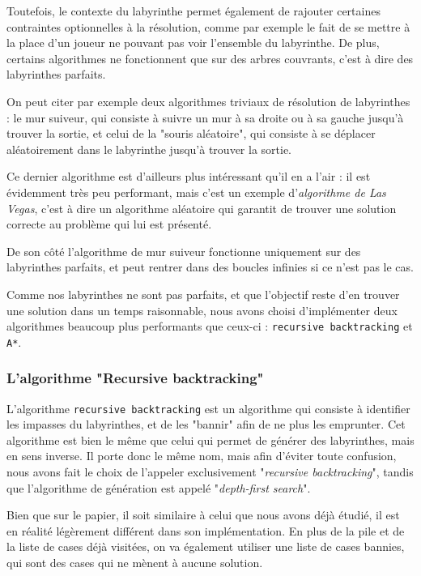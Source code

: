 \documentclass[12pt]{scrreprt} %
\begin{document}
Toutefois, le contexte du labyrinthe permet également de rajouter certaines contraintes optionnelles à la résolution, comme par exemple le fait de se mettre à la place d'un joueur ne pouvant pas voir l'ensemble du labyrinthe. De plus, certains algorithmes ne fonctionnent que sur des arbres couvrants, c'est à dire des labyrinthes parfaits.

On peut citer par exemple deux algorithmes triviaux de résolution de labyrinthes : le mur suiveur, qui consiste à suivre un mur à sa droite ou à sa gauche jusqu'à trouver la sortie, et celui de la "souris aléatoire", qui consiste à se déplacer aléatoirement dans le labyrinthe jusqu'à trouver la sortie.

Ce dernier algorithme est d'ailleurs plus intéressant qu'il en a l'air : il est évidemment très peu performant, mais c'est un exemple d'\textit{algorithme de Las Vegas}, c'est à dire un algorithme aléatoire qui garantit de trouver une solution correcte au problème qui lui est présenté.

De son côté l'algorithme de mur suiveur fonctionne uniquement sur des labyrinthes parfaits, et peut rentrer dans des boucles infinies si ce n'est pas le cas.

Comme nos labyrinthes ne sont pas parfaits, et que l'objectif reste d'en trouver une solution dans un temps raisonnable, nous avons choisi d'implémenter deux algorithmes beaucoup plus performants que ceux-ci : \texttt{recursive backtracking} et \texttt{A*}.

\subsubsection{L'algorithme "Recursive backtracking"}

L'algorithme \texttt{recursive backtracking} est un algorithme qui consiste à identifier les impasses du labyrinthes, et de les "bannir" afin de ne plus les emprunter. Cet algorithme est bien le même que celui qui permet de générer des labyrinthes, mais en sens inverse. Il porte donc le même nom, mais afin d'éviter toute confusion, nous avons fait le choix de l'appeler exclusivement "\textit{recursive backtracking}", tandis que l'algorithme de génération est appelé "\textit{depth-first search}".

Bien que sur le papier, il soit similaire à celui que nous avons déjà étudié, il est en réalité légèrement différent dans son implémentation. En plus de la pile et de la liste de cases déjà visitées, on va également utiliser une liste de cases bannies, qui sont des cases qui ne mènent à aucune solution.
\end{document}

